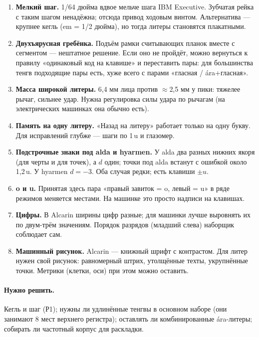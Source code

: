 \documentclass[11pt,a4paper]{article}
\begin{document}
\begin{enumerate}[label=Р\arabic*.]
  \item \textbf{Мелкий шаг.} 1/64 дюйма вдвое мельче шага IBM Executive. Зубчатая рейка с таким шагом ненадёжна; отсюда привод ходовым винтом. Альтернатива — крупнее кегль (em = 1/2 дюйма), но тогда литеры становятся плакатными.
  \item \textbf{Двухъярусная гребёнка.} Подъём рамки считывающих планок вместе с сегментом — нештатное решение. Если оно не пройдёт, можно вернуться к правилу «одинаковый код на клавише» и переставить пары: для большинства тенгв подходящие пары есть, хуже всего с парами «гласная / ára+гласная».
  \item \textbf{Масса широкой литеры.} 6,4 мм лица против $\approx$2,5 мм у пики: тяжелее рычаг, сильнее удар. Нужна регулировка силы удара по рычагам (на электрических машинках она обычно есть).
  \item \textbf{Память на одну литеру.} «Назад на литеру» работает только на одну букву. Для исправлений глубже — шаги по 1\,u и глазомер.
  \item \textbf{Подстрочные знаки под alda и hyarmen.} У alda два разных нижних якоря (для черты и для точек), а $d$ один; точки под alda встанут с ошибкой около 1,2\,u. У hyarmen $d = -3$. Оба случая редки; есть клавиши $\pm u$.
  \item \textbf{o и u.} Принятая здесь пара «правый завиток = o, левый = u» в ряде режимов меняется местами. На машинке это просто надписи на клавишах.
  \item \textbf{Цифры.} В Alcarin ширины цифр разные; для машинки лучше выровнять их по двум-трём значениям. Порядок разрядов (младший слева) наборщик соблюдает сам.
  \item \textbf{Машинный рисунок.} Alcarin — книжный шрифт с контрастом. Для литер нужен свой рисунок: равномерный штрих, утолщённые техты, укрупнённые точки. Метрики (клетки, оси) при этом можно оставить.
\end{enumerate}

\paragraph{Нужно решить.} Кегль и шаг (Р1); нужны ли удлинённые тенгвы в основном наборе (они занимают 8 мест верхнего регистра); оставлять ли комбинированные ára-литеры; собирать ли частотный корпус для раскладки.

\appendix
\end{document}
